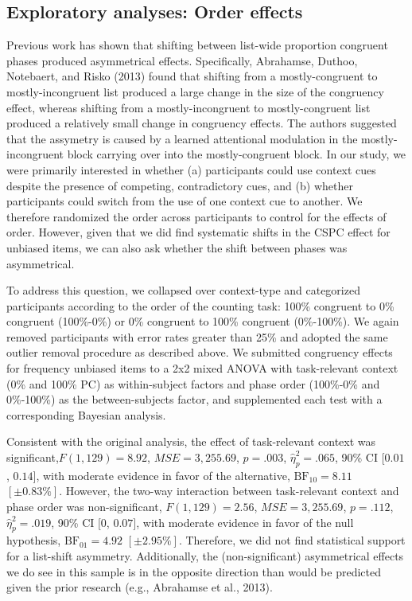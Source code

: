 \documentclass[english,,man,floatsintext]{apa6}
\begin{document}
\hypertarget{exploratory-analyses-order-effects}{%
\subsection{Exploratory analyses: Order effects}\label{exploratory-analyses-order-effects}}



Previous work has shown that shifting between list-wide proportion congruent phases produced asymmetrical effects. Specifically, Abrahamse, Duthoo, Notebaert, and Risko (2013) found that shifting from a mostly-congruent to mostly-incongruent list produced a large change in the size of the congruency effect, whereas shifting from a mostly-incongruent to mostly-congruent list produced a relatively small change in congruency effects. The authors suggested that the assymetry is caused by a learned attentional modulation in the mostly-incongruent block carrying over into the mostly-congruent block. In our study, we were primarily interested in whether (a) participants could use context cues despite the presence of competing, contradictory cues, and (b) whether participants could switch from the use of one context cue to another. We therefore randomized the order across participants to control for the effects of order. However, given that we did find systematic shifts in the CSPC effect for unbiased items, we can also ask whether the shift between phases was asymmetrical.

To address this question, we collapsed over context-type and categorized participants according to the order of the counting task: 100\% congruent to 0\% congruent (100\%-0\%) or 0\% congruent to 100\% congruent (0\%-100\%). We again removed participants with error rates greater than 25\% and adopted the same outlier removal procedure as described above. We submitted congruency effects for frequency unbiased items to a 2x2 mixed ANOVA with task-relevant context (0\% and 100\% PC) as within-subject factors and phase order (100\%-0\% and 0\%-100\%) as the between-subjects factor, and supplemented each test with a corresponding Bayesian analysis.

Consistent with the original analysis, the effect of task-relevant context was significant,\(F(1, 129) = 8.92\), \(\mathit{MSE} = 3,255.69\), \(p = .003\), \(\hat{\eta}^2_p = .065\), 90\% CI \([0.01\), \(0.14]\), with moderate evidence in favor of the alternative, \(\mathrm{BF}_{\textrm{10}} = 8.11\) \([\pm 0.83\%]\). However, the two-way interaction between task-relevant context and phase order was non-significant, \(F(1, 129) = 2.56\), \(\mathit{MSE} = 3,255.69\), \(p = .112\), \(\hat{\eta}^2_p = .019\), 90\% CI \([0\), \(0.07]\), with moderate evidence in favor of the null hypothesis, \(\mathrm{BF}_{\textrm{01}} = 4.92\) \([\pm 2.95\%]\). Therefore, we did not find statistical support for a list-shift asymmetry. Additionally, the (non-significant) asymmetrical effects we do see in this sample is in the opposite direction than would be predicted given the prior research (e.g., Abrahamse et al., 2013).
\end{document}
